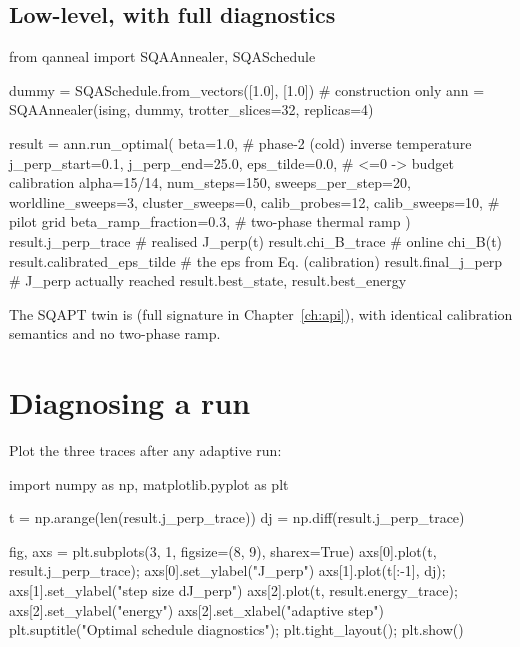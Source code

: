 \subsection{Low-level, with full diagnostics}

\begin{pycode}
from qanneal import SQAAnnealer, SQASchedule

dummy = SQASchedule.from_vectors([1.0], [1.0])  # construction only
ann = SQAAnnealer(ising, dummy, trotter_slices=32, replicas=4)

result = ann.run_optimal(
    beta=1.0,                    # phase-2 (cold) inverse temperature
    j_perp_start=0.1, j_perp_end=25.0,
    eps_tilde=0.0,               # <=0 -> budget calibration
    alpha=15/14, num_steps=150, sweeps_per_step=20,
    worldline_sweeps=3, cluster_sweeps=0,
    calib_probes=12, calib_sweeps=10,   # pilot grid
    beta_ramp_fraction=0.3,             # two-phase thermal ramp
)
result.j_perp_trace          # realised J_perp(t)
result.chi_B_trace           # online chi_B(t)
result.calibrated_eps_tilde  # the eps from Eq. (calibration)
result.final_j_perp          # J_perp actually reached
result.best_state, result.best_energy
\end{pycode}

The SQAPT twin is 
(full signature in Chapter~\ref{ch:api}), with identical calibration
semantics and no two-phase ramp.

\section{Diagnosing a run}
\label{sec:optimal-diagnostics}

Plot the three traces after any adaptive run:

\begin{pycode}
import numpy as np, matplotlib.pyplot as plt

t  = np.arange(len(result.j_perp_trace))
dj = np.diff(result.j_perp_trace)

fig, axs = plt.subplots(3, 1, figsize=(8, 9), sharex=True)
axs[0].plot(t, result.j_perp_trace);  axs[0].set_ylabel("J_perp")
axs[1].plot(t[:-1], dj);              axs[1].set_ylabel("step size dJ_perp")
axs[2].plot(t, result.energy_trace);  axs[2].set_ylabel("energy")
axs[2].set_xlabel("adaptive step")
plt.suptitle("Optimal schedule diagnostics"); plt.tight_layout(); plt.show()
\end{pycode}


